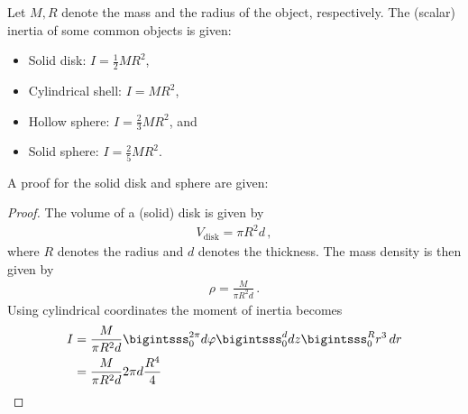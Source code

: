     \begin{example}
        Let $M,R$ denote the mass and the radius of the object, respectively. The (scalar) inertia of some common objects is given:
        \begin{itemize}
            \item Solid disk: $I = \frac{1}{2}MR^2$,
            \item Cylindrical shell: $I = MR^2$,
            \item Hollow sphere: $I = \frac{2}{3}MR^2$, and
            \item Solid sphere: $I = \frac{2}{5}MR^2$.
        \end{itemize}
        A proof for the solid disk and sphere are given:
        \begin{mdframed}[roundcorner=10pt, linecolor=blue, linewidth=1pt]
            \begin{proof}[Proof]
                The volume of a (solid) disk is given by
                \begin{gather}
                    V_{\text{disk}}=\pi R^2d\,,
                \end{gather}
                where $R$ denotes the radius and $d$ denotes the thickness. The mass density is then given by
                \begin{gather}
                    \rho=\frac{M}{\pi R^2d}\,.
                \end{gather}
                Using cylindrical coordinates the moment of inertia becomes
                \begin{align}
                    I &= \frac{M}{\pi R^2d}\bigintsss_0^{2\pi}d\varphi\bigintsss_0^ddz\bigintsss_0^Rr^3\,dr\nonumber\\
                    &= \frac{M}{\pi R^2d}2\pi d\frac{R^4}{4}\nonumber\\

\end{align}
\end{proof}
\end{mdframed}
\end{example}
